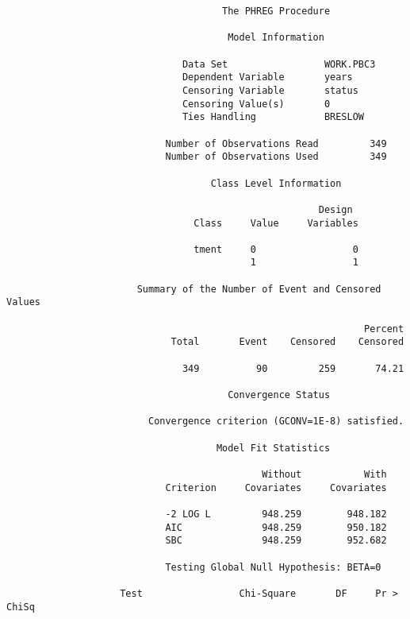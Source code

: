 \documentclass[
  letterpaper,
  DIV=11,
  numbers=noendperiod]{scrreprt}
\begin{document}
\begin{verbatim}
                                      The PHREG Procedure

                                       Model Information

                               Data Set                 WORK.PBC3
                               Dependent Variable       years    
                               Censoring Variable       status   
                               Censoring Value(s)       0        
                               Ties Handling            BRESLOW  

                            Number of Observations Read         349
                            Number of Observations Used         349

                                    Class Level Information
 
                                                       Design
                                 Class     Value     Variables

                                 tment     0                 0
                                           1                 1

                       Summary of the Number of Event and Censored Values
 
                                                               Percent
                             Total       Event    Censored    Censored

                               349          90         259       74.21

                                       Convergence Status

                         Convergence criterion (GCONV=1E-8) satisfied.          

                                     Model Fit Statistics
 
                                             Without           With
                            Criterion     Covariates     Covariates

                            -2 LOG L         948.259        948.182
                            AIC              948.259        950.182
                            SBC              948.259        952.682

                            Testing Global Null Hypothesis: BETA=0
 
                    Test                 Chi-Square       DF     Pr > ChiSq


\end{verbatim}
\end{document}
